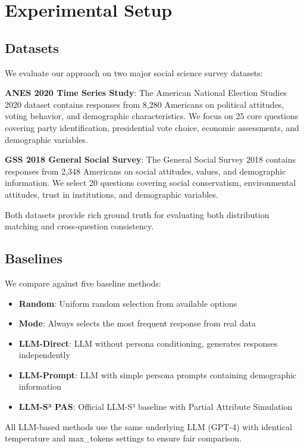\documentclass[sigconf, anonymous]{acmart}
\begin{document}
\section{Experimental Setup}

\subsection{Datasets}

We evaluate our approach on two major social science survey datasets:

\textbf{ANES 2020 Time Series Study}: The American National Election Studies 2020 dataset contains responses from 8,280 Americans on political attitudes, voting behavior, and demographic characteristics. We focus on 25 core questions covering party identification, presidential vote choice, economic assessments, and demographic variables.

\textbf{GSS 2018 General Social Survey}: The General Social Survey 2018 contains responses from 2,348 Americans on social attitudes, values, and demographic information. We select 20 questions covering social conservatism, environmental attitudes, trust in institutions, and demographic variables.

Both datasets provide rich ground truth for evaluating both distribution matching and cross-question consistency.

\subsection{Baselines}

We compare against five baseline methods:

\begin{itemize}
    \item \textbf{Random}: Uniform random selection from available options
    \item \textbf{Mode}: Always selects the most frequent response from real data
    \item \textbf{LLM-Direct}: LLM without persona conditioning, generates responses independently
    \item \textbf{LLM-Prompt}: LLM with simple persona prompts containing demographic information
    \item \textbf{LLM-S³ PAS}: Official LLM-S³ baseline with Partial Attribute Simulation
\end{itemize}

All LLM-based methods use the same underlying LLM (GPT-4) with identical temperature and max_tokens settings to ensure fair comparison.
\end{document}
